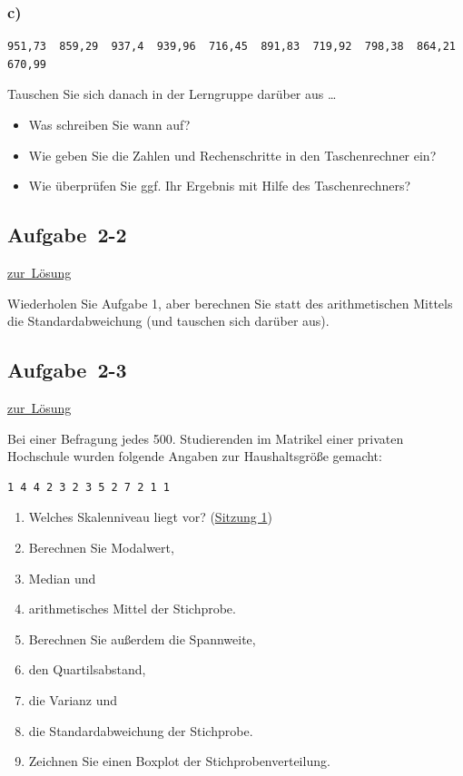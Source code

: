 \documentclass[
  11pt,
  ngerman,
  a4paper,
]{report}
\providecommand{\tightlist}{%
  \setlength{\itemsep}{0pt}\setlength{\parskip}{0pt}}
\begin{document}
\hypertarget{c}{%
\subsubsection{c)}\label{c}}

\begin{verbatim}
951,73  859,29  937,4  939,96  716,45  891,83  719,92  798,38  864,21  670,99
\end{verbatim}

Tauschen Sie sich danach in der Lerngruppe darüber aus \ldots{}

\begin{itemize}
\tightlist
\item
  Was schreiben Sie wann auf?
\item
  Wie geben Sie die Zahlen und Rechenschritte in den Taschenrechner ein?
\item
  Wie überprüfen Sie ggf. Ihr Ergebnis mit Hilfe des Taschenrechners?
\end{itemize}

\hypertarget{aufgabe-2-2}{%
\subsection{Aufgabe~2-2}\label{aufgabe-2-2}}

\protect\hyperlink{loesung-2-2}{zur~Lösung}

Wiederholen Sie Aufgabe 1, aber berechnen Sie statt des arithmetischen Mittels die Standardabweichung (und tauschen sich darüber aus).

\hypertarget{aufgabe-2-3}{%
\subsection{Aufgabe~2-3}\label{aufgabe-2-3}}

\protect\hyperlink{loesung-2-3}{zur~Lösung}

Bei einer Befragung jedes 500. Studierenden im Matrikel einer privaten Hochschule wurden folgende Angaben zur Haushaltsgröße gemacht:

\begin{verbatim}
1 4 4 2 3 2 3 5 2 7 2 1 1
\end{verbatim}

\begin{enumerate}
\def\labelenumi{\alph{enumi})}
\tightlist
\item
  Welches Skalenniveau liegt vor? (\protect\hyperlink{skalenniveaus}{Sitzung 1})
\item
  Berechnen Sie Modalwert,
\item
  Median und
\item
  arithmetisches Mittel der Stichprobe.
\item
  Berechnen Sie außerdem die Spannweite,
\item
  den Quartilsabstand,
\item
  die Varianz und
\item
  die Standardabweichung der Stichprobe.
\item
  Zeichnen Sie einen Boxplot der Stichprobenverteilung.
\end{enumerate}
\end{document}
